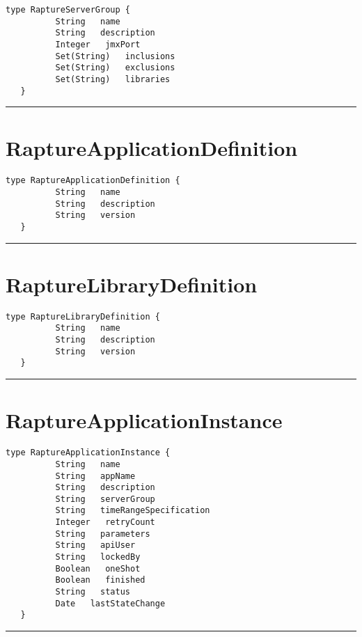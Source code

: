 \begin{lstlisting}[style=nonumbers]
   type RaptureServerGroup {
          String   name
          String   description
          Integer   jmxPort
          Set(String)   inclusions
          Set(String)   exclusions
          Set(String)   libraries
   }
\end{lstlisting}

\rule{12cm}{2pt}
\section{RaptureApplicationDefinition}
\label{type:RaptureApplicationDefinition}

\begin{lstlisting}[style=nonumbers]
   type RaptureApplicationDefinition {
          String   name
          String   description
          String   version
   }
\end{lstlisting}

\rule{12cm}{2pt}
\section{RaptureLibraryDefinition}
\label{type:RaptureLibraryDefinition}

\begin{lstlisting}[style=nonumbers]
   type RaptureLibraryDefinition {
          String   name
          String   description
          String   version
   }
\end{lstlisting}

\rule{12cm}{2pt}
\section{RaptureApplicationInstance}
\label{type:RaptureApplicationInstance}

\begin{lstlisting}[style=nonumbers]
   type RaptureApplicationInstance {
          String   name
          String   appName
          String   description
          String   serverGroup
          String   timeRangeSpecification
          Integer   retryCount
          String   parameters
          String   apiUser
          String   lockedBy
          Boolean   oneShot
          Boolean   finished
          String   status
          Date   lastStateChange
   }
\end{lstlisting}

\rule{12cm}{2pt}
